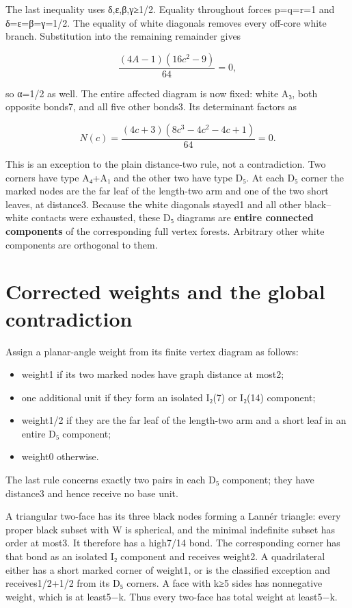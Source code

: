 \documentclass[
  10pt,
]{report}
\providecommand{\tightlist}{%
  \setlength{\itemsep}{0pt}\setlength{\parskip}{0pt}}
\begin{document}
The last inequality uses δ,ε,β,γ≥1/2. Equality throughout forces p=q=r=1
and δ=ε=β=γ=1/2. The equality of white diagonals removes every off-core
white branch. Substitution into the remaining remainder gives

\[
 \frac{(4A-1)(16c^2-9)}{64}=0,
\]

so α=1/2 as well. The entire affected diagram is now fixed: white A₃,
both opposite bonds7, and all five other bonds3. Its determinant factors
as

\[
 N(c)=\frac{(4c+3)(8c^3-4c^2-4c+1)}{64}=0.
\]

This is an exception to the plain distance-two rule, not a
contradiction. Two corners have type A₄+A₁ and the other two have type
D₅. At each D₅ corner the marked nodes are the far leaf of the
length-two arm and one of the two short leaves, at distance3. Because
the white diagonals stayed1 and all other black--white contacts were
exhausted, these D₅ diagrams are \textbf{entire connected components} of
the corresponding full vertex forests. Arbitrary other white components
are orthogonal to them.

\section{Corrected weights and the global
contradiction}\label{corrected-weights-and-the-global-contradiction}

Assign a planar-angle weight from its finite vertex diagram as follows:

\begin{itemize}
\tightlist
\item
  weight1 if its two marked nodes have graph distance at most2;
\item
  one additional unit if they form an isolated I₂(7) or I₂(14)
  component;
\item
  weight1/2 if they are the far leaf of the length-two arm and a short
  leaf in an entire D₅ component;
\item
  weight0 otherwise.
\end{itemize}

The last rule concerns exactly two pairs in each D₅ component; they have
distance3 and hence receive no base unit.

A triangular two-face has its three black nodes forming a Lannér
triangle: every proper black subset with W is spherical, and the minimal
indefinite subset has order at most3. It therefore has a high7/14 bond.
The corresponding corner has that bond as an isolated I₂ component and
receives weight2. A quadrilateral either has a short marked corner of
weight1, or is the classified exception and receives1/2+1/2 from its D₅
corners. A face with k≥5 sides has nonnegative weight, which is at
least5−k. Thus every two-face has total weight at least5−k.
\end{document}
